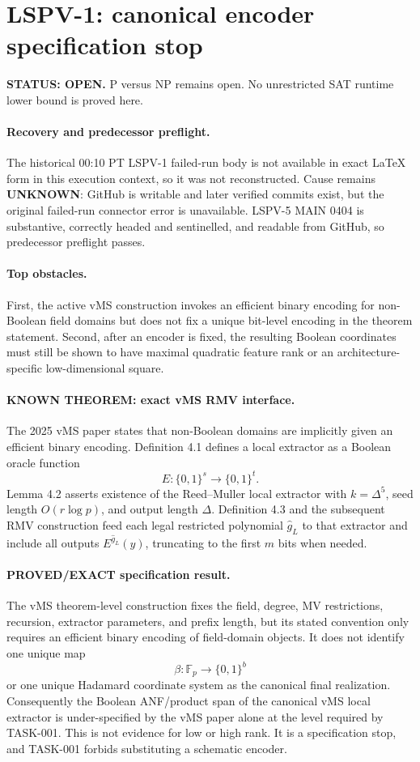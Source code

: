 \documentclass[11pt]{article}
\begin{document}
\section*{LSPV-1: canonical encoder specification stop}
\textbf{STATUS: OPEN.} P versus NP remains open. No unrestricted SAT runtime lower bound is proved here.

\paragraph{Recovery and predecessor preflight.}
The historical 00:10 PT LSPV-1 failed-run body is not available in exact LaTeX form in this execution context, so it was not reconstructed. Cause remains \textbf{UNKNOWN}: GitHub is writable and later verified commits exist, but the original failed-run connector error is unavailable. LSPV-5 MAIN 0404 is substantive, correctly headed and sentinelled, and readable from GitHub, so predecessor preflight passes.

\paragraph{Top obstacles.}
First, the active vMS construction invokes an efficient binary encoding for non-Boolean field domains but does not fix a unique bit-level encoding in the theorem statement. Second, after an encoder is fixed, the resulting Boolean coordinates must still be shown to have maximal quadratic feature rank or an architecture-specific low-dimensional square.

\paragraph{KNOWN THEOREM: exact vMS RMV interface.}
The 2025 vMS paper states that non-Boolean domains are implicitly given an efficient binary encoding. Definition 4.1 defines a local extractor as a Boolean oracle function
\[
E:\{0,1\}^{s}\to\{0,1\}^{t}.
\]
Lemma 4.2 asserts existence of the Reed--Muller local extractor with $k=\Delta^5$, seed length $O(r\log p)$, and output length $\Delta$. Definition 4.3 and the subsequent RMV construction feed each legal restricted polynomial $\widehat g_L$ to that extractor and include all outputs $E^{\widehat g_L}(y)$, truncating to the first $m$ bits when needed.

\paragraph{PROVED/EXACT specification result.}
The vMS theorem-level construction fixes the field, degree, MV restrictions, recursion, extractor parameters, and prefix length, but its stated convention only requires an efficient binary encoding of field-domain objects. It does not identify one unique map
\[
\beta:\mathbb F_p\longrightarrow\{0,1\}^{b}
\]
or one unique Hadamard coordinate system as the canonical final realization. Consequently the Boolean ANF/product span of the canonical vMS local extractor is under-specified by the vMS paper alone at the level required by TASK-001. This is not evidence for low or high rank. It is a specification stop, and TASK-001 forbids substituting a schematic encoder.
\end{document}
